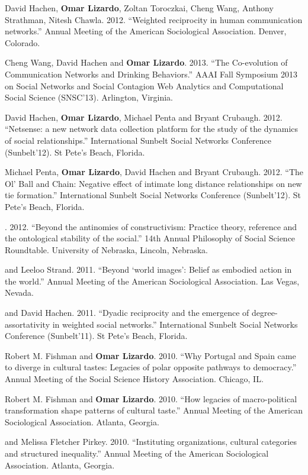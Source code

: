 \ind David Hachen, {\bf Omar Lizardo}, Zoltan Toroczkai,  Cheng Wang, Anthony Strathman, Nitesh Chawla. 2012. ``Weighted reciprocity in human communication networks.''  Annual Meeting of the American Sociological Association. Denver, Colorado. 

\ind Cheng Wang, David Hachen and {\bf Omar Lizardo}. 2013. ``The Co-evolution of Communication Networks and Drinking Behaviors.'' AAAI Fall Symposium 2013 on
Social Networks and Social Contagion Web Analytics and Computational Social Science (SNSC'13). Arlington, Virginia.

\ind David Hachen, {\bf Omar Lizardo}, Michael Penta and Bryant Crubaugh.  2012. ``Netsense: a new network data collection platform for the study of the dynamics of social relationships.''  International Sunbelt Social Networks Conference (Sunbelt'12). St Pete's Beach, Florida. 

\ind Michael Penta, {\bf Omar Lizardo}, David Hachen and Bryant Crubaugh. 2012. ``The Ol' Ball and Chain: Negative effect of intimate long distance relationships on new tie formation.'' International Sunbelt Social Networks Conference (Sunbelt'12). St Pete's Beach, Florida.

.  2012. ``Beyond the antinomies of constructivism:  Practice theory, reference and the ontological stability of the social.''  14th Annual Philosophy of Social Science Roundtable.  University of Nebraska, Lincoln, Nebraska.

 and Leeloo Strand. 2011.  ``Beyond `world images': Belief as embodied action in the world.''  Annual Meeting of the American Sociological Association. Las Vegas, Nevada. 

 and David Hachen. 2011.  ``Dyadic reciprocity and the emergence of degree-assortativity in weighted social networks.''  International Sunbelt Social Networks Conference (Sunbelt'11). St Pete's Beach, Florida. 

\ind Robert M. Fishman and {\bf Omar Lizardo}. 2010.  ``Why Portugal and Spain came to diverge in cultural tastes: Legacies of polar opposite pathways to democracy.'' Annual Meeting of the Social Science History Association. Chicago, IL. 

\ind Robert M. Fishman and {\bf Omar Lizardo}. 2010.  ``How legacies of macro-political transformation shape patterns of cultural taste.'' Annual Meeting of the American Sociological Association. Atlanta, Georgia. 

 and Melissa Fletcher Pirkey. 2010.  ``Instituting organizations, cultural categories and structured inequality.'' Annual Meeting of the American Sociological Association. Atlanta, Georgia. 

